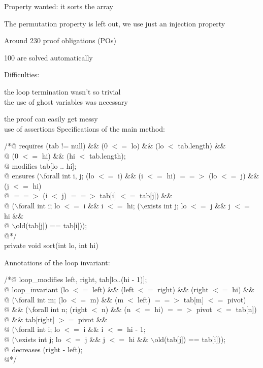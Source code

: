 \blist
\item Property wanted: it sorts the array
\item The permutation property is left out, we use just an {\purple injection} property
\elist
{}
\small
\blist
\item Around 230 proof obligations (POs)
\item 100 are solved automatically
\item Difficulties: 
\blist 
\item the {\purple loop termination} wasn't so trivial\\
\rarrow the use of {\purple ghost variables} was necessary
\item the proof can easily get {\purple messy}\\
\rarrow use of assertions
\elist
\elist
{}
\small
Specifications of the main method:
\begin{tabbing}
/*\=@ {\purple requ}\={\purple ires} (tab != null) \&\& (0 $<=$ lo) \&\& (lo $<$ tab.length) \&\&\+ \\
  @     \>(0 $<=$ hi) \&\& (hi $<$ tab.length);\\
    @ {\purple modifies} tab[lo .. hi];\\
    @ {\purple ensures} ($\backslash$forall int i, j; (lo $<=$ i) \&\& (i $<=$ hi) $==>$ (lo $<=$ j) \&\& (j $<=$ hi) \\
    @             \> $==>$ (i $<$ j) $==>$ tab[i] $<=$ tab[j]) \&\&\\
    @             \>($\backslash$forall int i\=; lo $<=$ i \&\& i $<=$ hi; ($\backslash$exists int j; lo $<=$ j \&\& j $<=$ hi \&\& \\
 @ \>\>$\backslash$old(tab[j]) == tab[i])); \\
    @*/\\
        private void sort(int lo, int hi)\\
\end{tabbing}
\small
Annotations of the loop invariant:
\begin{tabbing}
/*\=@ {\purple loop\_modifies} left, right, tab[lo..(hi - 1)];\+\\
  @ {\purple loop\_}\={\purple invariant} \= (lo $<=$ left) \&\& (left $<=$ right) \&\& (right $<=$ hi) \&\& \\
  @    \>($\backslash$forall int m; (lo $<=$ m) \&\& (m $<$ left) $==>$ tab[m] $<=$ pivot) \\
  @    \>\&\& ($\backslash$forall int n; (right $<$ n) \&\& (n $<=$ hi) $==>$ pivot  $<=$ tab[n])\\
  @     \>\&\& tab[right] $>=$ pivot \&\&\\
  @     \> ($\backslash$forall int i; lo $<=$ i \&\& i $<=$ hi - 1; \\
@ \>\>($\backslash$exists int j; lo $<=$ j \&\& j $<=$ hi \&\& $\backslash$old(tab[j]) == tab[i]));\\
  @ {\purple decreases} (right - left);\\
  @*/
\end{tabbing}
